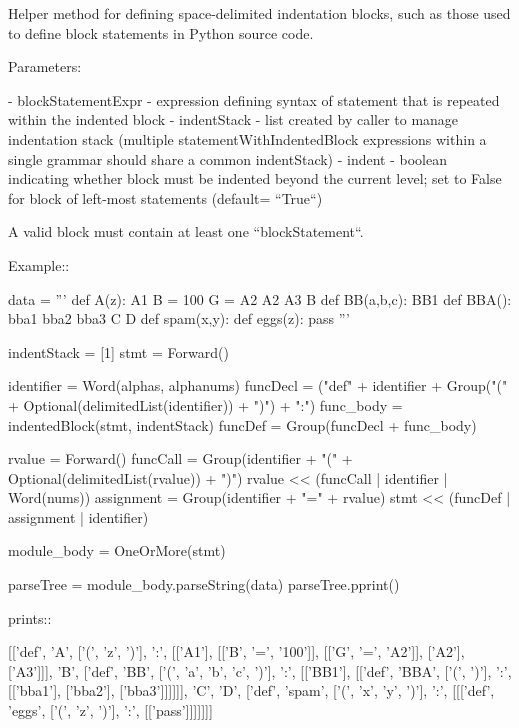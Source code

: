 \begin{DoxyVerb}Helper method for defining space-delimited indentation blocks,
such as those used to define block statements in Python source code.

Parameters:

 - blockStatementExpr - expression defining syntax of statement that
   is repeated within the indented block
 - indentStack - list created by caller to manage indentation stack
   (multiple statementWithIndentedBlock expressions within a single
   grammar should share a common indentStack)
 - indent - boolean indicating whether block must be indented beyond
   the current level; set to False for block of left-most
   statements (default= ``True``)

A valid block must contain at least one ``blockStatement``.

Example::

    data = '''
    def A(z):
      A1
      B = 100
      G = A2
      A2
      A3
    B
    def BB(a,b,c):
      BB1
      def BBA():
        bba1
        bba2
        bba3
    C
    D
    def spam(x,y):
         def eggs(z):
             pass
    '''


    indentStack = [1]
    stmt = Forward()

    identifier = Word(alphas, alphanums)
    funcDecl = ("def" + identifier + Group("(" + Optional(delimitedList(identifier)) + ")") + ":")
    func_body = indentedBlock(stmt, indentStack)
    funcDef = Group(funcDecl + func_body)

    rvalue = Forward()
    funcCall = Group(identifier + "(" + Optional(delimitedList(rvalue)) + ")")
    rvalue << (funcCall | identifier | Word(nums))
    assignment = Group(identifier + "=" + rvalue)
    stmt << (funcDef | assignment | identifier)

    module_body = OneOrMore(stmt)

    parseTree = module_body.parseString(data)
    parseTree.pprint()

prints::

    [['def',
      'A',
      ['(', 'z', ')'],
      ':',
      [['A1'], [['B', '=', '100']], [['G', '=', 'A2']], ['A2'], ['A3']]],
     'B',
     ['def',
      'BB',
      ['(', 'a', 'b', 'c', ')'],
      ':',
      [['BB1'], [['def', 'BBA', ['(', ')'], ':', [['bba1'], ['bba2'], ['bba3']]]]]],
     'C',
     'D',
     ['def',
      'spam',
      ['(', 'x', 'y', ')'],
      ':',
      [[['def', 'eggs', ['(', 'z', ')'], ':', [['pass']]]]]]]
\end{DoxyVerb}
 \mbox{\label{namespacepip_1_1__vendor_1_1pyparsing_a903af58ccce454d06c0733cf907f9220}} 
